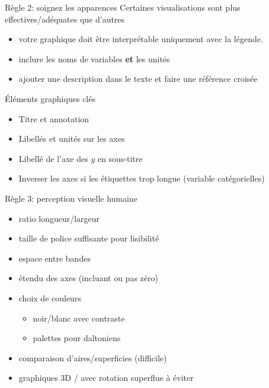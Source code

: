 \documentclass[
  ignorenonframetext,
]{beamer}
\providecommand{\tightlist}{%
  \setlength{\itemsep}{0pt}\setlength{\parskip}{0pt}}\usepackage{longtable,booktabs,array}
\begin{document}
\begin{frame}{Règle 2: soignez les apparences}
\protect\hypertarget{ruxe8gle-2-soignez-les-apparences}{}
Certaines visualisations sont plus effectives/adéquates que d'autres

\begin{itemize}
\tightlist
\item
  votre graphique doit être interprétable uniquement avec la légende.
\item
  inclure les noms de variables \textbf{et} les unités
\item
  ajouter une description dans le texte et faire une référence croisée
\end{itemize}
\end{frame}

\begin{frame}{Éléments graphiques clés}
\protect\hypertarget{uxe9luxe9ments-graphiques-cluxe9s}{}
\begin{itemize}
\tightlist
\item
  Titre et annotation
\item
  Libellés et unités sur les axes
\item
  Libellé de l'axe des \(y\) en sous-titre
\item
  Inverser les axes si les étiquettes trop longue (variable
  catégorielles)
\end{itemize}
\end{frame}

\begin{frame}{Règle 3: perception visuelle humaine}
\protect\hypertarget{ruxe8gle-3-perception-visuelle-humaine}{}
\begin{itemize}
\tightlist
\item
  ratio longueur/largeur
\item
  taille de police suffisante pour lisibilité
\item
  espace entre bandes
\item
  étendu des axes (incluant ou pas zéro)
\item
  choix de couleurs

  \begin{itemize}
  \tightlist
  \item
    noir/blanc avec contraste
  \item
    palettes pour daltoniens
  \end{itemize}
\item
  comparaison d'aires/superficies (difficile)
\item
  graphiques 3D / avec rotation superflue à éviter
\end{itemize}
\end{frame}
\end{document}

